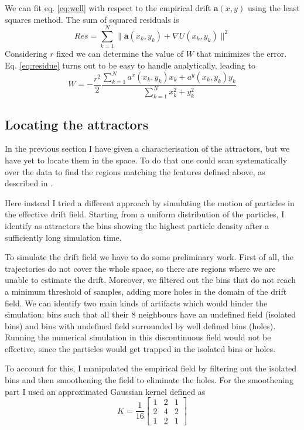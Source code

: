 \documentclass[a4paper]{article}
\begin{document}
We can fit eq. \ref{eq:well} with respect to the empirical drift $\bm{a}(x, y)$ using the least squares method. The sum of squared residuals is
\begin{equation} \label{eq:residue}
Res = \sum_{k = 1}^N \| \bm{a}(x_k, y_k) + \nabla U(x_k, y_k) \|^2
\end{equation}
Considering $r$ fixed we can determine the value of $W$ that minimizes the error. Eq. \ref{eq:residue} turns out to be easy to handle analytically, leading to
\begin{equation}
W = - \frac{r^2}{2} \frac{\sum_{k = 1}^N a^x(x_k, y_k) x_k + a^y(x_k, y_k) y_k}{\sum_{k = 1}^N x_k^2 + y_k^2}
\end{equation}

\subsection{Locating the attractors}

In the previous section I have given a characterisation of the attractors, but we have yet to locate them in the space. To do that one could scan systematically over the data to find the regions matching the features defined above, as described in \cite{hoze2012}.

Here instead I tried a different approach by simulating the motion of particles in the effective drift field. Starting from a uniform distribution of the particles, I identify as attractors the bins showing the highest particle density after a sufficiently long simulation time.

To simulate the drift field we have to do some preliminary work. First of all, the trajectories do not cover the whole space, so there are regions where we are unable to estimate the drift. Moreover, we filtered out the bins that do not reach a minimum threshold of samples, adding more holes in the domain of the drift field.
We can identify two main kinds of artifacts which would hinder the simulation: bins such that all their 8 neighbours have an undefined field (isolated bins) and bins with undefined field surrounded by well defined bins (holes). Running the numerical simulation in this discontinuous field would not be effective, since the particles would get trapped in the isolated bins or holes.

To account for this, I manipulated the empirical field by filtering out the isolated bins and then smoothening the field to eliminate the holes. For the smoothening part I used an approximated Gaussian kernel defined as
\begin{equation}
K = \frac{1}{16} \begin{bmatrix} 1 & 2 & 1 \\ 2 & 4 & 2 \\ 1 & 2 & 1\end{bmatrix}
\end{equation}
\end{document}
